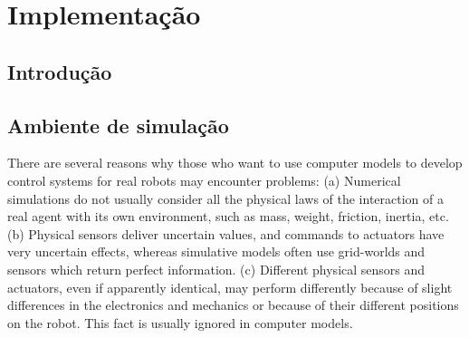 \chapter{Implementação}
\label{implementacao}

\section{Introdução}

\section{Ambiente de simulação}



\cite{miglino96evolving}
There are several reasons why those who want to use computer models to develop control
systems for real robots may encounter problems:
(a) Numerical simulations do not usually consider all the physical laws of the interaction of
a real agent with its own environment, such as mass, weight, friction, inertia, etc.
(b) Physical sensors deliver uncertain values, and commands to actuators have very
uncertain effects, whereas simulative models often use grid-worlds and sensors which return
perfect information.
(c) Different physical sensors and actuators, even if apparently identical, may perform
differently because of slight differences in the electronics and mechanics or because of their
different positions on the robot. This fact is usually ignored in computer models.



